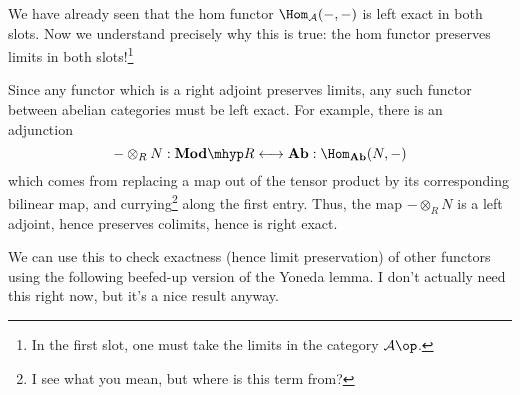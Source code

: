 \documentclass[main.tex]{subfiles}
\begin{document}
We have already seen that the hom functor $\Hom_{\mathcal{A}}(-,-)$ is left exact in both slots. Now we understand precisely why this is true: the hom functor preserves limits in both slots!\footnote{In the first slot, one must take the limits in the category $\mathcal{A}\op$.}

Since any functor which is a right adjoint preserves limits, any such functor between abelian categories must be left exact. For example, there is an adjunction
\begin{equation*}
  - \otimes_{R} N : \mathbf{Mod}\mhyp R \longleftrightarrow \mathbf{Ab} : \Hom_{\mathbf{Ab}}(N, -)
\end{equation*}
which comes from replacing a map out of the tensor product by its corresponding bilinear map, and currying\footnote{I see what you mean, but where is this term from?} along the first entry. Thus, the map $- \otimes_{R} N$ is a left adjoint, hence preserves colimits, hence is right exact.

We can use this to check exactness (hence limit preservation) of other functors using the following beefed-up version of the Yoneda lemma. I don't actually need this right now, but it's a nice result anyway.
\end{document}
